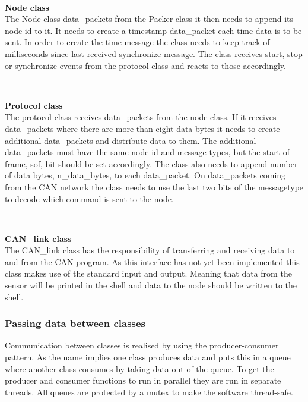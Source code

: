 ~\\ \par \textbf{Node class} ~ \\
The Node class data\_packets from the Packer class it then needs to append its node id to it.
It needs to create a timestamp data\_packet each time data is to be sent.
In order to create the time message the class needs to keep track of milliseconds since last received synchronize message.
The class receives start, stop or synchronize events from the protocol class and reacts to those accordingly.

~\\ \par \textbf{Protocol class} ~ \\
The protocol class receives data\_packets from the node class. 
If it receives data\_packets where there are more than eight data bytes it needs to create additional data\_packets and distribute data to them. 
The additional data\_packets must have the same node id and message types, but the start of frame, sof, bit should be set accordingly.
The class also needs to append number of data bytes, n\_data\_bytes, to each data\_packet.
On data\_packets coming from the CAN network the class needs to use the last two bits of the messagetype to decode which command is sent to the node.

~\\ \par \textbf{CAN\_link class} ~ \\
The CAN\_link class has the responsibility of transferring and receiving data to and from the CAN program.
As this interface has not yet been implemented this class makes use of the standard input and output. 
Meaning that data from the sensor will be printed in the shell and data to the node should be written to the shell. 

\subsubsection*{Passing data between classes}
Communication between classes is realised by using the producer-consumer pattern.
As the name implies one class produces data and puts this in a queue where another class consumes by taking data out of the queue.
To get the producer and consumer functions to run in parallel they are run in separate threads.
All queues are protected by a mutex to make the software thread-safe.

